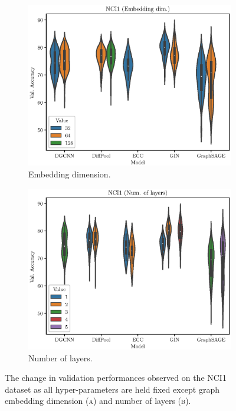 \begin{figure}[h!]
    \centering
    \begin{subfigure}[b]{0.49\textwidth}
        \centering
        \includegraphics[width=\textwidth]{Figures/Chapter4/nci1-embedding.eps}
        \caption{Embedding dimension.}
        \label{fig:nci1-layer}
    \end{subfigure}
    \hfill
    \begin{subfigure}[b]{0.49\textwidth}
        \centering
        \includegraphics[width=\textwidth]{Figures/Chapter4/nci1-layers.eps}
        \caption{Number of layers.}
        \label{fig:nci1-emb}
    \end{subfigure}
       \caption{The change in validation performances observed on the NCI1 dataset as all hyper-parameters are held fixed except graph embedding dimension \textsc{(a)} and number of layers \textsc{(b)}.}
       \label{fig:nci1-posthoc}
\end{figure}

